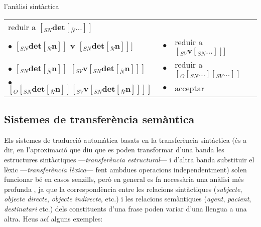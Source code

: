 \begin{persabermes}{l'anàlisi sintàctica}
\begin{center}
\begin{tabular}{l|r|l}
      reduir a $[_{SN} \textbf{det} [_{\bar{N}} \ldots ] ]$
      \\
      $\bullet$ $[_{SN} \textbf{det} [_{\bar{N}} \textbf{n} ] ]$
      \textbf{v} $[_{SN} \textbf{det} [_{\bar{N}} \textbf{n} ] ] ]$
      & 
      $\bullet$
      & 
      reduir a $[_{SV} \textbf{v} [_{SN} \ldots ] ] ]$
      \\
      $\bullet$ $[_{SN} \textbf{det} [_{\bar{N}} \textbf{n} ] ]$
      $[_{SV} \textbf{v}  [_{SN} \textbf{det} [_{\bar{N}} \textbf{n} ] ] ]$
      & 
      $\bullet$
      & 
      reduir a $[_O [_{SN} \ldots ] [_{SV} \ldots ] ]$
      \\
      $\bullet$ $[_O [_{SN} \textbf{det} [_{\bar{N}} \textbf{n} ] ] [_{SV} \textbf{v}  [_{SN} \textbf{det} [_{\bar{N}} \textbf{n} ]
      ] ] ]$
      & 
      $\bullet$
      & 
      acceptar
      \\
      \hline
    \end{tabular}
  \end{center}
\end{persabermes}

\subsection{Sistemes de transferència semàntica}
\label{s3:transsem}

Els sistemes de traducció automàtica basats en la transferència
sintàctica (és a dir, en l'aproximació que diu que es poden
transformar d'una banda les estructures sintàctiques
---\emph{transferència estructural}--- i d'altra banda substituir el
lèxic ---\emph{transferència lèxica}--- fent ambdues operacions
independentment) solen funcionar bé en casos senzills, però en general
es fa necessària una anàlisi més profunda \citep{hovy93j}, ja que la
correspondència entre les relacions sintàctiques (\emph{subjecte},
\emph{objecte directe}, \emph{objecte indirecte}, etc.)  i les
relacions semàntiques (\emph{agent}, \emph{pacient},
\emph{destinatari} etc.)  dels constituents d'una frase poden variar
d'una llengua a una altra.  Heus ací alguns exemples:


